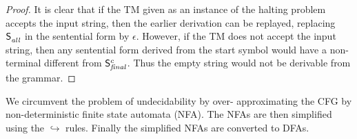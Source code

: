 \documentclass[preprint,9pt]{sigplanconf}
\begin{document}
\begin{proof}
It is clear that if the TM given as an instance of the halting problem
accepts the input string, then the earlier derivation can be replayed,
replacing   $\mathsf{S}_{\mathit{all}}^{}$   in   the  sentential   form   by
$\epsilon$. However, if the TM does  not accept the input string, then
any  sentential  form derived  from  the  start  symbol would  have  a
non-terminal different from $\mathsf{S}_{\mathit{final}}^{c}$. Thus the empty
string would not be derivable from the grammar.
\end{proof}


We circumvent  the problem  of undecidability  by over-
approximating the CFG by non-deterministic finite state
automata (NFA). The NFAs  are then simplified using the
$\hookrightarrow$ rules.   Finally the  simplified NFAs
are converted to DFAs.

\end{document}
